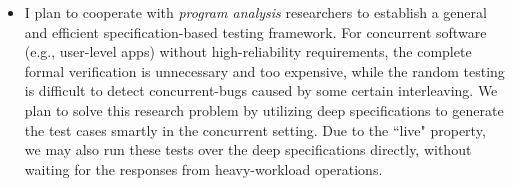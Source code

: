 \documentclass[a4paper, 10pt]{article}
\begin{document}
\begin{small}
\begin{itemize}
\begin{comment}
However, it is still a big challenge on how to formally model the time. We believe that the cure is still the event-based concurrent context.  
I am looking forward to exploring this huge research opportunity when combining the formal verification with CPS.
\end{comment}

\item I plan to cooperate with
\emph{program analysis} researchers to establish a general and efficient specification-based testing framework.
For concurrent software (e.g., user-level apps) without high-reliability requirements, 
the complete formal verification is unnecessary and too expensive,
while the
random testing is difficult to detect concurrent-bugs caused by some certain interleaving.
We plan to solve this research problem by utilizing deep specifications to generate the test cases
smartly in the concurrent setting. Due to the ``live" property, we may also run these tests  over the deep specifications directly, without waiting for the responses from heavy-workload operations. 

\end{itemize}

\begin{comment}

But how to generate test cases smartly is always  for concurrent programs.
We believe that deep specifications can be 
There is a huge research opportunity 
lying in this zero-vulnerability system stack, but 

My Yale colleagues
and I have already started to use CertiKOS to verify more systems in this stack,
such as the file system and the network stacks.
Meanwhile, 
set up 
that enables the random test for user-level applications upon the topmost layer interface of mCertiKOS.
I believe there is a huge research opportunity that

and I am looking forward to exploring it.


 
 dramatically improve
the reliability and security of computing hosts in the critical areas.
This goal requires a wide and profound
cooperation with researchers in different areas.

utilize it  Based on the hardware that supports cryptography primitives, I want to
establish a reliable and secure stack that integrates the
This zero-vulnerability system stack will dramatically improve
the reliability and security of computing hosts in the critical areas. 
However, there are two significant challenges in building such a stack:
(1)  systems at different levels may have various
reliability requirements, some of which are still unclear how
to they can be specified and verified (e.g., the network stacks); and (2)
it is a big unknown how to link
all the certified systems together in a single framework
and provide the guarantee of the entire stack.


\end{comment}
\end{small}
\end{document}
